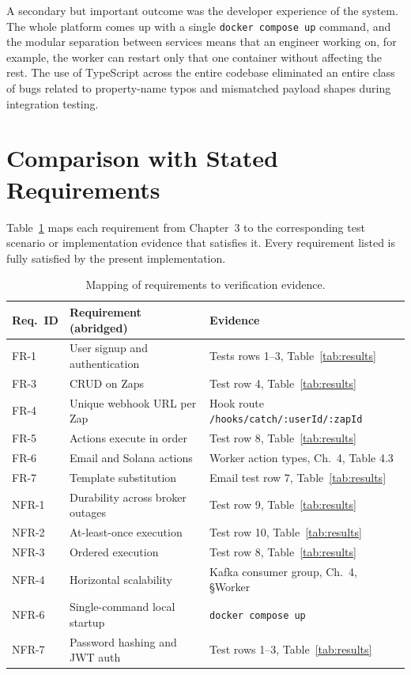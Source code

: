A secondary but important outcome was the developer experience of the system. The whole platform comes up with a single \texttt{docker compose up} command, and the modular separation between services means that an engineer working on, for example, the worker can restart only that one container without affecting the rest. The use of TypeScript across the entire codebase eliminated an entire class of bugs related to property-name typos and mismatched payload shapes during integration testing.

\section{Comparison with Stated Requirements}

Table~\ref{tab:req-compliance} maps each requirement from Chapter~3 to the corresponding test scenario or implementation evidence that satisfies it. Every requirement listed is fully satisfied by the present implementation.

\begin{table}[h]
\centering
\caption{Mapping of requirements to verification evidence.}
\label{tab:req-compliance}
\renewcommand{\arraystretch}{1.3}
\begin{tabular}{|p{2.0cm}|p{6.0cm}|p{5.5cm}|}
\hline
\textbf{Req.\ ID} & \textbf{Requirement (abridged)} & \textbf{Evidence} \\ \hline
FR-1 & User signup and authentication & Tests rows 1--3, Table~\ref{tab:results} \\ \hline
FR-3 & CRUD on Zaps & Test row 4, Table~\ref{tab:results} \\ \hline
FR-4 & Unique webhook URL per Zap & Hook route \texttt{/hooks/catch/:userId/:zapId} \\ \hline
FR-5 & Actions execute in order & Test row 8, Table~\ref{tab:results} \\ \hline
FR-6 & Email and Solana actions & Worker action types, Ch.\ 4, Table 4.3 \\ \hline
FR-7 & Template substitution & Email test row 7, Table~\ref{tab:results} \\ \hline
NFR-1 & Durability across broker outages & Test row 9, Table~\ref{tab:results} \\ \hline
NFR-2 & At-least-once execution & Test row 10, Table~\ref{tab:results} \\ \hline
NFR-3 & Ordered execution & Test row 8, Table~\ref{tab:results} \\ \hline
NFR-4 & Horizontal scalability & Kafka consumer group, Ch.\ 4, \S Worker \\ \hline
NFR-6 & Single-command local startup & \texttt{docker compose up} \\ \hline
NFR-7 & Password hashing and JWT auth & Test rows 1--3, Table~\ref{tab:results} \\ \hline
\end{tabular}
\end{table}
